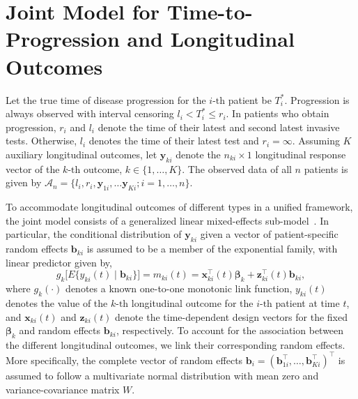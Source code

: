 \section{Joint Model for Time-to-Progression and Longitudinal Outcomes}
\label{sec:jointmodel}
Let the true time of disease progression for the ${i\mbox{-th}}$ patient be $T_i^*$. Progression is always observed with interval censoring ${l_i < T_i^* \leq r_i}$. In patients who obtain progression, $r_i$ and $l_i$ denote the time of their latest and second latest invasive tests. Otherwise, $l_i$ denotes the time of their latest test and ${r_i=\infty}$. Assuming $K$ auxiliary longitudinal outcomes, let $\boldsymbol{y}_{ki}$ denote the ${n_{ki} \times 1}$ longitudinal response vector of the ${k\mbox{-th}}$ outcome, $k\in\{1, \ldots, K\}$. The observed data of all $n$ patients is given by ${\mathcal{A}_n = \{l_i, r_i, \boldsymbol{y}_{1i},\ldots \boldsymbol{y}_{Ki}; i = 1, \ldots, n\}}$.

To accommodate longitudinal outcomes of different types in a unified framework, the joint model consists of a generalized linear mixed-effects sub-model~\citep{laird1982random}. In particular, the conditional
distribution of $\boldsymbol{y}_{ki}$ given a vector of patient-specific random effects $\boldsymbol{b}_{ki}$ is assumed to be a member of the exponential family, with linear predictor given by,
\begin{equation}
\label{eq:long_model}
g_k\big[E\{y_{ki} (t) \mid \boldsymbol{b}_{ki}\}\big] = m_{ki}(t) = \boldsymbol{x}_{ki}^{\top}(t)\boldsymbol{\beta}_{k} + \boldsymbol{z}_{ki}^{\top}(t)\boldsymbol{b}_{ki},
\end{equation}
where $g_k(\cdot)$ denotes a known one-to-one monotonic link function, $y_{ki}(t)$ denotes the
value of the ${k\mbox{-th}}$ longitudinal outcome for the ${i\mbox{-th}}$ patient at time $t$, and $\boldsymbol{x}_{ki}(t)$ and $\boldsymbol{z}_{ki}(t)$ denote the time-dependent design vectors for the fixed $\boldsymbol{\beta}_{k}$ and random effects $\boldsymbol{b}_{ki}$, respectively. To account for the association between the different longitudinal outcomes, we link their corresponding random effects. More specifically, the complete vector of random effects ${\boldsymbol{b}_{i} = (\boldsymbol{b}_{1i}^{\top}, \ldots, \boldsymbol{b}_{Ki}^{\top})^{\top}}$ is assumed to follow a multivariate normal distribution with mean zero and variance-covariance matrix $W$.

